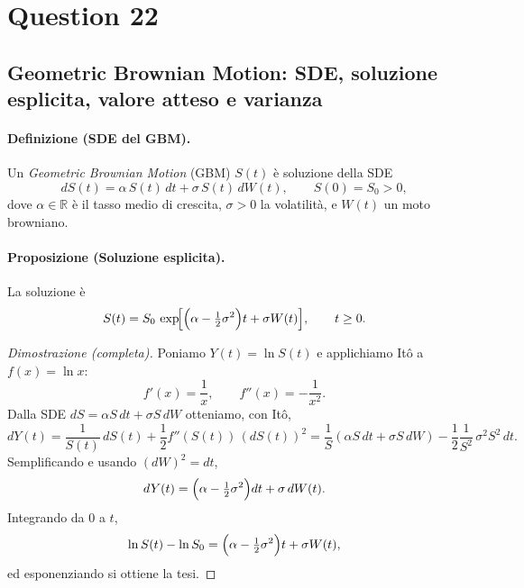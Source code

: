 \documentclass[12pt,a4paper]{book}
\theoremstyle{remark}
\begin{document}
\newpage
\section{Question 22}
\subsection*{Geometric Brownian Motion: SDE, soluzione esplicita, valore atteso e varianza}

\paragraph{Definizione (SDE del GBM).}
Un \emph{Geometric Brownian Motion} (GBM) $S(t)$ è soluzione della SDE
\[
dS(t)=\alpha\,S(t)\,dt+\sigma\,S(t)\,dW(t),\qquad S(0)=S_0>0,
\]
dove $\alpha\in\mathbb{R}$ è il tasso medio di crescita, $\sigma>0$ la volatilità, e $W(t)$ un moto browniano.

\paragraph{Proposizione (Soluzione esplicita).}
La soluzione è
\[
S(t)=S_0\,\exp\!\Bigl[\Bigl(\alpha-\tfrac{1}{2}\sigma^2\Bigr)t+\sigma W(t)\Bigr],\qquad t\ge 0.
\]

\begin{proof}[Dimostrazione (completa)]
Poniamo $Y(t)=\ln S(t)$ e applichiamo Itô a $f(x)=\ln x$:
\[
f'(x)=\frac{1}{x},\qquad f''(x)=-\frac{1}{x^2}.
\]
Dalla SDE $dS=\alpha S\,dt+\sigma S\,dW$ otteniamo, con Itô,
\[
dY(t)=\frac{1}{S(t)}\,dS(t)+\frac{1}{2}f''(S(t))\,(dS(t))^2
       =\frac{1}{S}(\alpha S\,dt+\sigma S\,dW)-\frac{1}{2}\frac{1}{S^2}\,\sigma^2 S^2\,dt.
\]
Semplificando e usando $(dW)^2=dt$,
\[
dY(t)=\Bigl(\alpha-\tfrac{1}{2}\sigma^2\Bigr)dt+\sigma\,dW(t).
\]
Integrando da $0$ a $t$,
\[
\ln S(t)-\ln S_0=\Bigl(\alpha-\tfrac{1}{2}\sigma^2\Bigr)t+\sigma W(t),
\]
ed esponenziando si ottiene la tesi.
\end{proof}
\end{document}
